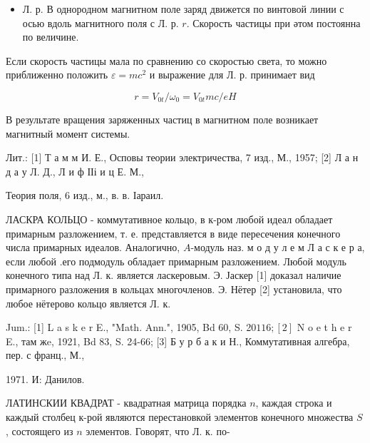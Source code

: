 \documentclass[10pt]{article}
\begin{document}
\begin{itemize}

  \item Л. р. В однородном магнитном поле заряд движется по винтовой линии с осью вдоль магнитного поля с Л. р. $r$. Скорость частицы при әтом постоянна по величине.

\end{itemize}



Если скорость частицы мала по сравнению со скоростью света, то можно приближенно положить $\varepsilon=m c^{2}$ и выражение для Л. р. принимает вид



\[

r=V_{0 t} / \omega_{0}=V_{0 t} m c / e H

\]



В результате вращения заряженных частиц в магнитном поле возникает магнитный момент системы.



Лит.: [1] Т а м м И. Е., Осповы теории электричества, 7 изд., М., 1957; [2] Л а н д а у Л. Д., Л и ф ІІі и ц Е. М.,



Теория поля, 6 изд., м., в. в. Іараил.

ЛАСКРА КОЛЬЦО - коммутативное кольцо, в к-ром любой идеал обладает примарным разложением, т. е. представляется в виде пересечения конечного числа примарных идеалов. Аналогично, $A$-модуль наз. м о д у л е м Л а с к е р а, если любой .его подмодуль обладает примарным разложением. Любой модуль конечного типа над Л. к. является ласкеровым. Э. Јаскер [1] доказал наличие примарного разложения в кольцах многочленов. Э. Нётер [2] установила, что любое нётерово кольцо является Л. к.



Jum.: [1] L a s k e r E., "Math. Ann.", 1905, Bd 60, S. 20$116 ;[2]$ N o e t h e r E., там жe, 1921, Bd 83, S. 24-66; [3] Б у р б а к и Н., Коммутативная алгебра, пер. с франц., М.,

1971. И: Данилов.



ЛАТИНСКИИ КВАДРАТ - квадратная матрица порядка $n$, каждая строка и каждый столбец к-рой являются перестановкой элементов конечного множества $S$, состоящего из $n$ элементов. Говорят, что Л. к. по-
\end{document}
